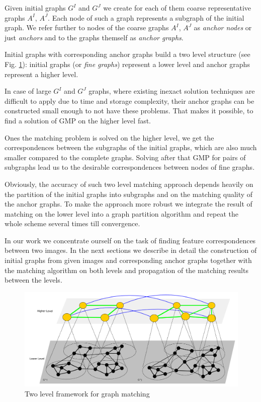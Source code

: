 \documentclass[
	fontsize=12pt,
	paper=a4,
	twoside=false,
	numbers=noenddot,
	plainheadsepline,
	toc=listof,
	toc=bibliography
]{scrartcl}
\begin{document}
Given initial graphs $G^I$ and $G^J$ we create for each of them coarse representative graphs $A^I$, $A^J$. Each node of such a graph represents a subgraph of the initial graph. We refer further to nodes of the coarse graphs $A^I$, $A^J$ as \emph{anchor nodes} or just \emph{anchors} and to the graphs themself as \emph{anchor graphs}.

Initial graphs with corresponding anchor graphs build a two level structure (see Fig. \ref{fig:2levels}): initial graphs (or \emph{fine graphs}) represent a lower level and anchor graphs represent a higher level.  

In case of large $G^I$ and $G^J$ graphs, where existing inexact solution techniques are difficult to apply due to time and storage complexity, their anchor graphs can be constructed small enough to not have these problems. That makes it possible, to find a solution of GMP on the higher level fast. 

Ones the matching problem is solved on the higher level, we get the correspondences between the subgraphs of the initial graphs, which are also much smaller compared to the complete graphs. Solving after that GMP for pairs of subgraphs lead us to the desirable correspondences between nodes of fine graphs.

Obviously, the accuracy of such two level matching approach depends heavily on the partition of the initial graphs into subgraphs and on the matching quality of the anchor graphs. To make the approach more robust we integrate the result of matching on the lower level into a graph partition algorithm and repeat the whole scheme several times till convergence.

In our work we concentrate ourself on the task of finding feature correspondences between two images. In the next sections we describe in detail the construction of initial graphs from given images and corresponding anchor graphs together with the matching algorithm on both levels and propagation of the matching results between the levels.

\begin{figure}
	\centering
	\includegraphics[scale=0.35]{fig/twolevels.pdf}
	\caption{Two level framework for graph matching} \label{fig:2levels}
\end{figure}
\end{document}
